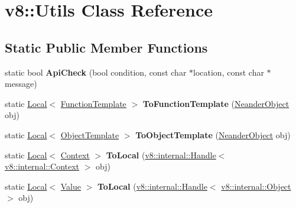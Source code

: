 \hypertarget{classv8_1_1_utils}{}\section{v8\+:\+:Utils Class Reference}
\label{classv8_1_1_utils}
\subsection*{Static Public Member Functions}
\begin{DoxyCompactItemize}
\item 
static bool {\bfseries Api\+Check} (bool condition, const char $\ast$location, const char $\ast$message)\hypertarget{classv8_1_1_utils_a1a1e634bae095bf6ff0ed2d9d737be00}{}\label{classv8_1_1_utils_a1a1e634bae095bf6ff0ed2d9d737be00}

\item 
static \hyperlink{classv8_1_1_local}{Local}$<$ \hyperlink{classv8_1_1_function_template}{Function\+Template} $>$ {\bfseries To\+Function\+Template} (\hyperlink{classv8_1_1_neander_object}{Neander\+Object} obj)\hypertarget{classv8_1_1_utils_a3e87b50ea80eaec33f192613755118df}{}\label{classv8_1_1_utils_a3e87b50ea80eaec33f192613755118df}

\item 
static \hyperlink{classv8_1_1_local}{Local}$<$ \hyperlink{classv8_1_1_object_template}{Object\+Template} $>$ {\bfseries To\+Object\+Template} (\hyperlink{classv8_1_1_neander_object}{Neander\+Object} obj)\hypertarget{classv8_1_1_utils_a7ae37e94d4dcac9865970e8a38d5001e}{}\label{classv8_1_1_utils_a7ae37e94d4dcac9865970e8a38d5001e}

\item 
static \hyperlink{classv8_1_1_local}{Local}$<$ \hyperlink{classv8_1_1_context}{Context} $>$ {\bfseries To\+Local} (\hyperlink{classv8_1_1internal_1_1_handle}{v8\+::internal\+::\+Handle}$<$ \hyperlink{classv8_1_1internal_1_1_context}{v8\+::internal\+::\+Context} $>$ obj)\hypertarget{classv8_1_1_utils_a3e12eece90343f71b7782f7b6c0c0f7b}{}\label{classv8_1_1_utils_a3e12eece90343f71b7782f7b6c0c0f7b}

\item 
static \hyperlink{classv8_1_1_local}{Local}$<$ \hyperlink{classv8_1_1_value}{Value} $>$ {\bfseries To\+Local} (\hyperlink{classv8_1_1internal_1_1_handle}{v8\+::internal\+::\+Handle}$<$ \hyperlink{classv8_1_1internal_1_1_object}{v8\+::internal\+::\+Object} $>$ obj)\hypertarget{classv8_1_1_utils_ae1c9265aa9041c666f09dd8aff84c293}{}\label{classv8_1_1_utils_ae1c9265aa9041c666f09dd8aff84c293}


\end{DoxyCompactItemize}
